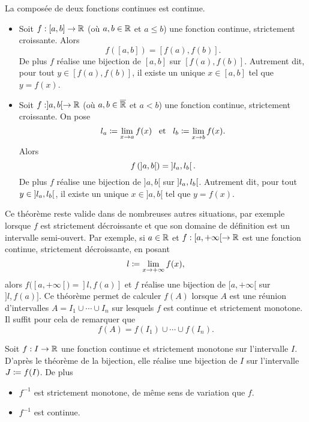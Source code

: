 \documentclass{magnoliaold}
\begin{document}
\begin{proposition}[utile=-3, nom={Théorèmes usuels}]
La composée de deux fonctions continues est continue.
\end{proposition}

\begin{theoreme}[nom={Théorème de la bijection}]
\begin{itemize}
\item Soit $f:[a,b]\to\mathbb{R}$ (où $a,b\in\mathbb{R}$ et $a\leq b$) une fonction continue, strictement croissante. Alors \[f([a,b])=[f(a),f(b)].\]
De plus $f$ réalise une bijection de $[a,b]$ sur
$[f(a),f(b)]$. Autrement dit, pour tout $y\in[f(a),f(b)]$, il existe un unique 
$x\in[a,b]$ tel que $y=f(x)$.
\item Soit $f:]a,b[\to\mathbb{R}$ (où $a,b\in\overline{\mathbb{R}}$ et $a<b$) une fonction continue, strictement croissante.
  On pose
  \[l_a\coloneqq\lim_{x\to a} f(x) \quad\!\text{et}\quad\! l_b\coloneqq\lim_{x\to b} f(x).\]
Alors
\[f\left(\left]a,b\right[\right)=\left]l_a,l_b\right[.\]
De plus $f$ réalise une bijection de $]a,b[$ sur $\left]l_a,l_b\right[$. Autrement dit,
pour tout $y\in\left]l_a,l_b\right[$, il existe un unique $x\in]a,b[$ tel que
$y=f(x)$.
\end{itemize}
\end{theoreme}

\begin{remarques}
\remarque Ce théorème reste valide dans de nombreuses autres situations, par exemple
  lorsque $f$ est strictement décroissante et
  que son domaine de définition est un intervalle semi-ouvert. Par exemple, si $a\in\mathbb{R}$
  et $f:[a,+\infty[\to\mathbb{R}$ est une fonction continue, strictement décroissante, en
  posant
  \[l\coloneqq\lim_{x\to +\infty} f(x),\]
  alors $f([a,+\infty[)=]l,f(a)]$ et  $f$ réalise une bijection de $[a,+\infty[$ sur $]l,f(a)]$.
\remarque Ce théorème permet
  de calculer $f(A)$ lorsque $A$ est une réunion d'intervalles
  $A=I_1\cup\cdots\cup I_n$ sur lesquels $f$ est continue et strictement monotone.
  Il suffit pour cela de remarquer que
  \[f(A)=f(I_1)\cup\cdots \cup f(I_n).\]
\end{remarques}

\begin{proposition}
Soit $f:I\to\mathbb{R}$ une fonction continue et strictement monotone sur l'intervalle $I$.
D'après le théorème de la bijection, elle réalise une bijection de $I$ sur
l'intervalle $J\coloneqq f(I)$. De plus
\begin{itemize}
\item $f^{-1}$ est strictement monotone, de même sens de variation que $f$. 
\item $f^{-1}$ est continue.
\end{itemize}
\end{proposition}
\end{document}

